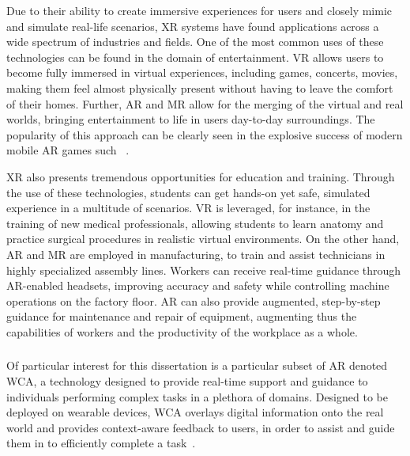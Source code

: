 \medskip

Due to their ability to create immersive experiences for users and closely mimic and simulate real-life scenarios, \gls{XR} systems have found applications across a wide spectrum of industries and fields.
One of the most common uses of these technologies can be found in the domain of entertainment.
\gls{VR} allows users to become fully immersed in virtual experiences, including games, concerts, movies, making them feel almost physically present without having to leave the comfort of their homes.
Further, \gls{AR} and \gls{MR} allow for the merging of the virtual and real worlds, bringing entertainment to life in users day-to-day surroundings.
The popularity of this approach can be clearly seen in the explosive success of modern mobile \gls{AR} games such ~\cite{pokemongo}.

\gls{XR} also presents tremendous opportunities for education and training.
Through the use of these technologies, students can get hands-on yet safe, simulated experience in a multitude of scenarios.
\gls{VR} is leveraged, for instance, in the training of new medical professionals, allowing students to learn anatomy and practice surgical procedures in realistic virtual environments.
On the other hand, \gls{AR} and \gls{MR} are employed in manufacturing, to train and assist technicians in highly specialized assembly lines.
Workers can receive real-time guidance through \gls{AR}-enabled headsets, improving accuracy and safety while controlling machine operations on the factory floor.
\gls{AR} can also provide augmented, step-by-step guidance for maintenance and repair of equipment, augmenting thus the capabilities of workers and the productivity of the workplace as a whole.

\subsubsection{}

Of particular interest for this dissertation is a particular subset of \gls{AR} denoted \acf{WCA}, a technology designed to provide real-time support and guidance to individuals performing complex tasks in a plethora of domains.
Designed to be deployed on wearable devices, \gls{WCA} overlays digital information onto the real world and provides context-aware feedback to users, in order to assist and guide them in to efficiently complete a task~\cite{ha2014towards,chen2015early,chen2018application,wang2020scaling}.

